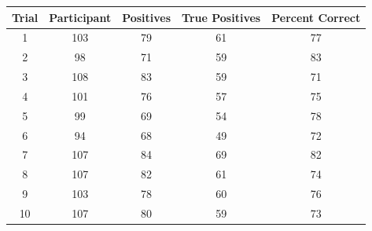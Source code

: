 \begin{tabular}{c|c|c|c|c}
Trial & Participant & Positives & True Positives & Percent Correct \\ \hline
1 & 103 & 79 & 61 & 77 \\
2 & 98 & 71 & 59 & 83 \\
3 & 108 & 83 & 59 & 71 \\
4 & 101 & 76 & 57 & 75 \\
5 & 99 & 69 & 54 & 78 \\
6 & 94 & 68 & 49 & 72 \\
7 & 107 & 84 & 69 & 82 \\
8 & 107 & 82 & 61 & 74 \\
9 & 103 & 78 & 60 & 76 \\
10 & 107 & 80 & 59 & 73 \\
\end{tabular}
